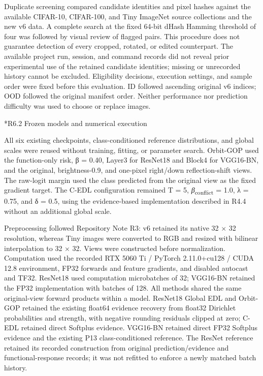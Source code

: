 \documentclass[11pt,a4paper]{article}
\makeatletter
\renewcommand\subsection{\@startsection{subsection}{2}{\z@}{-1.8ex plus -.5ex minus -.2ex}{.7ex plus .2ex}{\normalfont\normalsize\bfseries\raggedright}}
\makeatother
\begin{document}
Duplicate screening compared candidate identities and pixel hashes against the available CIFAR-10, CIFAR-100, and Tiny ImageNet source collections and the new v6 data. A complete search at the fixed 64-bit dHash Hamming threshold of four was followed by visual review of flagged pairs. This procedure does not guarantee detection of every cropped, rotated, or edited counterpart. The available project run, session, and command records did not reveal prior experimental use of the retained candidate identities; missing or unrecorded history cannot be excluded. Eligibility decisions, execution settings, and sample order were fixed before this evaluation. ID followed ascending original v6 indices; OOD followed the original manifest order. Neither performance nor prediction difficulty was used to choose or replace images.

\subsection*{R6.2 Frozen models and numerical execution}\label{s6.2-frozen-models-and-numerical-execution}

All six existing checkpoints, class-conditioned reference distributions, and global scales were reused without training, fitting, or parameter search. Orbit-GOP used the function-only risk, β = 0.40, Layer3 for ResNet18 and Block4 for VGG16-BN, and the original, brightness-0.9, and one-pixel right/down reflection-shift views. The raw-logit margin used the class predicted from the original view as the fixed gradient target. The C-EDL configuration remained T = 5, \emph{β}\textsubscript{conflict} = 1.0, λ = 0.75, and δ = 0.5, using the evidence-based implementation described in R4.4 without an additional global scale.

Preprocessing followed Repository Note R3: v6 retained its native 32 × 32 resolution, whereas Tiny images were converted to RGB and resized with bilinear interpolation to 32 × 32. Views were constructed before normalization. Computation used the recorded RTX 5060 Ti / PyTorch 2.11.0+cu128 / CUDA 12.8 environment, FP32 forwards and feature gradients, and disabled autocast and TF32. ResNet18 used computation microbatches of 32; VGG16-BN retained the FP32 implementation with batches of 128. All methods shared the same original-view forward products within a model. ResNet18 Global EDL and Orbit-GOP retained the existing float64 evidence recovery from float32 Dirichlet probabilities and strength, with negative rounding residuals clipped at zero; C-EDL retained direct Softplus evidence. VGG16-BN retained direct FP32 Softplus evidence and the existing P13 class-conditioned reference. The ResNet reference retained its recorded construction from original prediction/evidence and functional-response records; it was not refitted to enforce a newly matched batch history.
\end{document}

